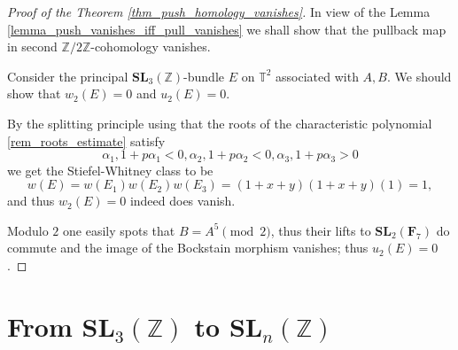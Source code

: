 \documentclass[a4paper]{article}
\newcommand{\SL}{\mathbf{SL}_3(\mathbb{Z})}        %
\newcommand{\SLn}{\mathbf{SL}_n(\mathbb{Z})}        %
\begin{document}
\begin{proof}[Proof of the Theorem \ref{thm_push_homology_vanishes}]
In view of the Lemma \ref{lemma_push_vanishes_iff_pull_vanishes} we shall show that the pullback map in second $\mathbb{Z}/ 2 \mathbb{Z}$-cohomology vanishes.

Consider the principal $\SL$-bundle $E$ on $\mathbb{T}^2$ associated with $A, B$.
We should show that $w_2(E) = 0$ and $u_2(E) = 0$.

By the splitting principle
using that the roots of the characteristic polynomial 
\ref{rem_roots_estimate} 
satisfy \[
\alpha_1, 1 + p \alpha_1 < 0, 
\alpha_2, 1 + p \alpha_2 < 0, 
\alpha_3, 1 + p \alpha_3 > 0 
\] 
we get the Stiefel-Whitney class to be
\[
w(E) = w(E_1) w(E_2) w (E_3)
= (1 + x + y) (1 + x + y) (1) 
= 1
,\]
and thus $w_2(E) = 0$ indeed does vanish.

Modulo $2$ one easily spots that $B = A^5 \pmod{2}$, thus their lifts to $\mathbf{SL}_2(\mathbf{F}_7)$ do commute and the image of the Bockstain morphism vanishes; thus $u_2(E) = 0$.
\end{proof}



\newpage
\section{From $\SL$ to $\SLn$}
\end{document}

